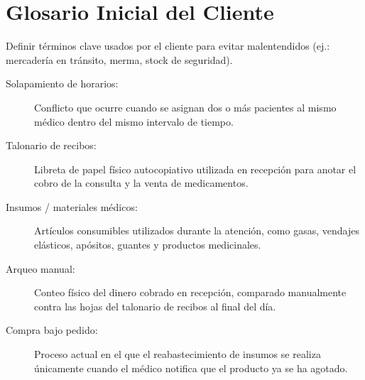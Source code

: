 \section{Glosario Inicial del Cliente}

Definir términos clave usados por el cliente para evitar malentendidos (ej.: mercadería en tránsito, merma, stock de seguridad).

\begin{description}
    \item[Solapamiento de horarios:] Conflicto que ocurre cuando se asignan dos o más pacientes al mismo médico dentro del mismo intervalo de tiempo.
    \item[Talonario de recibos:] Libreta de papel físico autocopiativo utilizada en recepción para anotar el cobro de la consulta y la venta de medicamentos.
    \item[Insumos / materiales médicos:] Artículos consumibles utilizados durante la atención, como gasas, vendajes elásticos, apósitos, guantes y productos medicinales.
    \item[Arqueo manual:] Conteo físico del dinero cobrado en recepción, comparado manualmente contra las hojas del talonario de recibos al final del día.
    \item[Compra bajo pedido:] Proceso actual en el que el reabastecimiento de insumos se realiza únicamente cuando el médico notifica que el producto ya se ha agotado.
\end{description}
